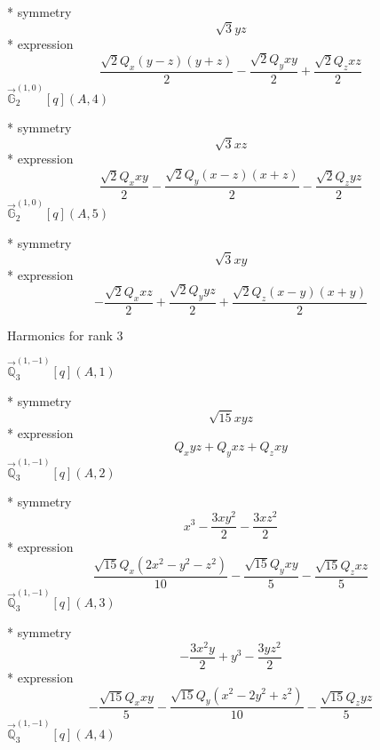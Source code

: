 \documentclass[fleqn,8pt]{jsarticle}
\begin{document}
\noindent\quad ** symmetry
\begin{dmath*}
\sqrt{3} y z
\end{dmath*}
\noindent\quad ** expression
\begin{dmath*}
\frac{\sqrt{2} Q_{x} \left(y - z\right) \left(y + z\right)}{2} - \frac{\sqrt{2} Q_{y} x y}{2} + \frac{\sqrt{2} Q_{z} x z}{2}
\end{dmath*}
\noindent\quad $\vec{\mathbb{G}}_{2}^{(1,0)}[q](A,4)$

\noindent\quad ** symmetry
\begin{dmath*}
\sqrt{3} x z
\end{dmath*}
\noindent\quad ** expression
\begin{dmath*}
\frac{\sqrt{2} Q_{x} x y}{2} - \frac{\sqrt{2} Q_{y} \left(x - z\right) \left(x + z\right)}{2} - \frac{\sqrt{2} Q_{z} y z}{2}
\end{dmath*}
\noindent\quad $\vec{\mathbb{G}}_{2}^{(1,0)}[q](A,5)$

\noindent\quad ** symmetry
\begin{dmath*}
\sqrt{3} x y
\end{dmath*}
\noindent\quad ** expression
\begin{dmath*}
- \frac{\sqrt{2} Q_{x} x z}{2} + \frac{\sqrt{2} Q_{y} y z}{2} + \frac{\sqrt{2} Q_{z} \left(x - y\right) \left(x + y\right)}{2}
\end{dmath*}

\noindent * Harmonics for rank 3

\noindent\quad $\vec{\mathbb{Q}}_{3}^{(1,-1)}[q](A,1)$

\noindent\quad ** symmetry
\begin{dmath*}
\sqrt{15} x y z
\end{dmath*}
\noindent\quad ** expression
\begin{dmath*}
Q_{x} y z + Q_{y} x z + Q_{z} x y
\end{dmath*}
\noindent\quad $\vec{\mathbb{Q}}_{3}^{(1,-1)}[q](A,2)$

\noindent\quad ** symmetry
\begin{dmath*}
x^{3} - \frac{3 x y^{2}}{2} - \frac{3 x z^{2}}{2}
\end{dmath*}
\noindent\quad ** expression
\begin{dmath*}
\frac{\sqrt{15} Q_{x} \left(2 x^{2} - y^{2} - z^{2}\right)}{10} - \frac{\sqrt{15} Q_{y} x y}{5} - \frac{\sqrt{15} Q_{z} x z}{5}
\end{dmath*}
\noindent\quad $\vec{\mathbb{Q}}_{3}^{(1,-1)}[q](A,3)$

\noindent\quad ** symmetry
\begin{dmath*}
- \frac{3 x^{2} y}{2} + y^{3} - \frac{3 y z^{2}}{2}
\end{dmath*}
\noindent\quad ** expression
\begin{dmath*}
- \frac{\sqrt{15} Q_{x} x y}{5} - \frac{\sqrt{15} Q_{y} \left(x^{2} - 2 y^{2} + z^{2}\right)}{10} - \frac{\sqrt{15} Q_{z} y z}{5}
\end{dmath*}
\noindent\quad $\vec{\mathbb{Q}}_{3}^{(1,-1)}[q](A,4)$
\end{document}
